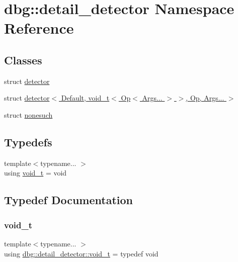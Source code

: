 \hypertarget{namespacedbg_1_1detail__detector}{}\section{dbg\+:\+:detail\+\_\+detector Namespace Reference}
\label{namespacedbg_1_1detail__detector}
\subsection*{Classes}
\begin{DoxyCompactItemize}
\item 
struct \hyperlink{structdbg_1_1detail__detector_1_1detector}{detector}
\item 
struct \hyperlink{structdbg_1_1detail__detector_1_1detector_3_01_default_00_01void__t_3_01_op_3_01_args_8_8_8_01_4b82e02bb2aa06b0130d0ab9c715e6bdd}{detector$<$ Default, void\+\_\+t$<$ Op$<$ Args... $>$ $>$, Op, Args... $>$}
\item 
struct \hyperlink{structdbg_1_1detail__detector_1_1nonesuch}{nonesuch}
\end{DoxyCompactItemize}
\subsection*{Typedefs}
\begin{DoxyCompactItemize}
\item 
{\footnotesize template$<$typename... $>$ }\\using \hyperlink{namespacedbg_1_1detail__detector_a1dbadccf461338e71c55ea392d4ed47c}{void\+\_\+t} = void
\end{DoxyCompactItemize}


\subsection{Typedef Documentation}
\mbox{\label{namespacedbg_1_1detail__detector_a1dbadccf461338e71c55ea392d4ed47c}} 
\subsubsection{\texorpdfstring{void\+\_\+t}{void\_t}}
{\footnotesize\ttfamily template$<$typename... $>$ \\
using \hyperlink{namespacedbg_1_1detail__detector_a1dbadccf461338e71c55ea392d4ed47c}{dbg\+::detail\+\_\+detector\+::void\+\_\+t} = typedef void}

